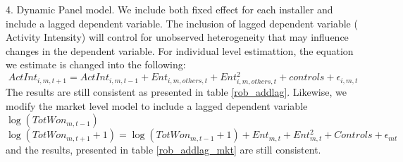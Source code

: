 \documentclass[msom,blindrev]{informs3}
\begin{document}
4. Dynamic Panel model. We include both fixed effect for each installer and include a lagged dependent variable. The inclusion of lagged dependent variable ( Activity Intensity) will control for unobserved heterogeneity that may influence changes in the dependent variable. For individual level estimattion, the equation we estimate is changed into the following: 
\begin{equation}
    ActInt_{i,m,t+1}=ActInt_{i,m,t-1}+Ent_{i,m,others,t}+Ent_{i,m,others,t}^2+  
    controls+\epsilon_{i,m,t} 
\end{equation}
The results are still consistent as presented in table \ref{rob_addlag}. 
Likewise, we modify the market level model to include a lagged dependent variable $\log(TotWon_{m,t-1})$
\begin{equation}
    \log(TotWon_{m,t+1}+1)=\log(TotWon_{m,t-1}+1)+Ent_{m,t}+Ent_{m,t}^2+Controls+\epsilon_{mt}
\end{equation} 
and the results, presented in table \ref{rob_addlag_mkt} are still consistent. 
\end{document}
